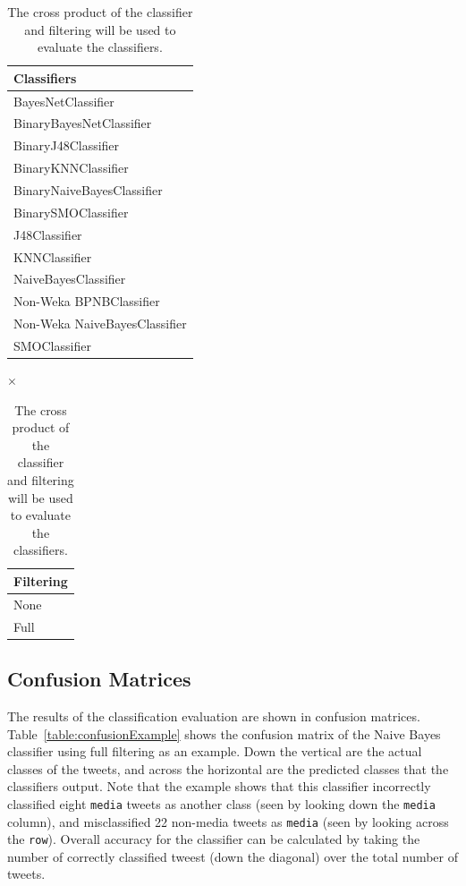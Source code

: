 \documentclass[12pt]{ucthesis}
\begin{document}
\begin{table}[H]
   \begin{center}
      \begin{tabular}{|l|}
         \hline
            \textbf{Classifiers}
         \tabularnewline\hline
            BayesNetClassifier
         \tabularnewline\hline
            BinaryBayesNetClassifier
         \tabularnewline\hline
            BinaryJ48Classifier
         \tabularnewline\hline
            BinaryKNNClassifier
         \tabularnewline\hline
            BinaryNaiveBayesClassifier
         \tabularnewline\hline
            BinarySMOClassifier
         \tabularnewline\hline
            J48Classifier
         \tabularnewline\hline
            KNNClassifier
         \tabularnewline\hline
            NaiveBayesClassifier
         \tabularnewline\hline
            Non-Weka BPNBClassifier
         \tabularnewline\hline
            Non-Weka NaiveBayesClassifier
         \tabularnewline\hline
            SMOClassifier
         \tabularnewline\hline
      \end{tabular}
      {
         \Huge
         $\times$
      }
      \begin{tabular}{|l|}
         \hline
            \textbf{Filtering}
         \tabularnewline\hline
            None
         \tabularnewline\hline
            Full
         \tabularnewline\hline
      \end{tabular}
      \caption[Classifier Evaluation Combinations]{The cross product of the classifier and filtering will be used to evaluate the classifiers.}
      \label{table:classifierEvaluationSpace}
   \end{center}
\end{table}

\subsection{Confusion Matrices}
\label{class-evaluation-confusion}
The results of the classification evaluation are shown in confusion matrices.
Table~\ref{table:confusionExample} shows the confusion matrix of the Naive Bayes classifier using full filtering as an example.
Down the vertical are the actual classes of the tweets, and across the horizontal are the predicted classes that the classifiers output.
Note that the example shows that this classifier incorrectly classified eight \texttt{media} tweets as another class (seen by looking down the \texttt{media} column),
and misclassified 22 non-media tweets as \texttt{media} (seen by looking across the \texttt{row}).
Overall accuracy for the classifier can be calculated by taking the number of correctly classified tweest (down the diagonal) over the total number of tweets.
\end{document}
